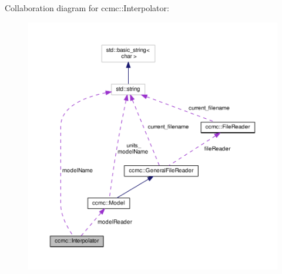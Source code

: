 Collaboration diagram for ccmc\-:\-:Interpolator\-:
\nopagebreak
\begin{figure}[H]
\begin{center}
\leavevmode
\includegraphics[width=350pt]{classccmc_1_1_interpolator__coll__graph}
\end{center}
\end{figure}
